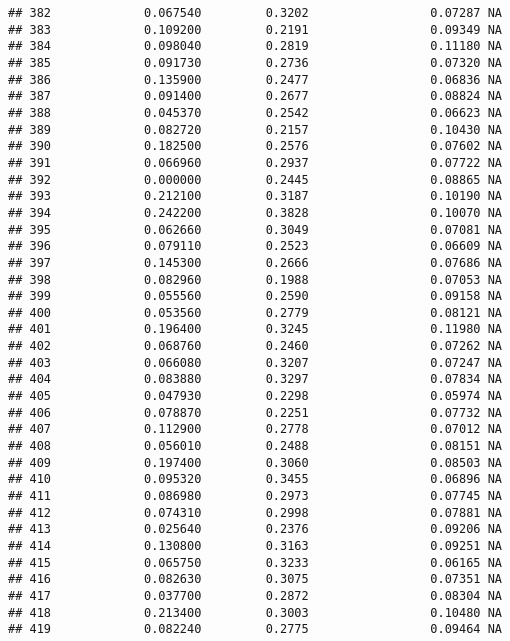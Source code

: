 \documentclass[
]{article}
\begin{document}
\begin{verbatim}
## 382             0.067540         0.3202                 0.07287 NA
## 383             0.109200         0.2191                 0.09349 NA
## 384             0.098040         0.2819                 0.11180 NA
## 385             0.091730         0.2736                 0.07320 NA
## 386             0.135900         0.2477                 0.06836 NA
## 387             0.091400         0.2677                 0.08824 NA
## 388             0.045370         0.2542                 0.06623 NA
## 389             0.082720         0.2157                 0.10430 NA
## 390             0.182500         0.2576                 0.07602 NA
## 391             0.066960         0.2937                 0.07722 NA
## 392             0.000000         0.2445                 0.08865 NA
## 393             0.212100         0.3187                 0.10190 NA
## 394             0.242200         0.3828                 0.10070 NA
## 395             0.062660         0.3049                 0.07081 NA
## 396             0.079110         0.2523                 0.06609 NA
## 397             0.145300         0.2666                 0.07686 NA
## 398             0.082960         0.1988                 0.07053 NA
## 399             0.055560         0.2590                 0.09158 NA
## 400             0.053560         0.2779                 0.08121 NA
## 401             0.196400         0.3245                 0.11980 NA
## 402             0.068760         0.2460                 0.07262 NA
## 403             0.066080         0.3207                 0.07247 NA
## 404             0.083880         0.3297                 0.07834 NA
## 405             0.047930         0.2298                 0.05974 NA
## 406             0.078870         0.2251                 0.07732 NA
## 407             0.112900         0.2778                 0.07012 NA
## 408             0.056010         0.2488                 0.08151 NA
## 409             0.197400         0.3060                 0.08503 NA
## 410             0.095320         0.3455                 0.06896 NA
## 411             0.086980         0.2973                 0.07745 NA
## 412             0.074310         0.2998                 0.07881 NA
## 413             0.025640         0.2376                 0.09206 NA
## 414             0.130800         0.3163                 0.09251 NA
## 415             0.065750         0.3233                 0.06165 NA
## 416             0.082630         0.3075                 0.07351 NA
## 417             0.037700         0.2872                 0.08304 NA
## 418             0.213400         0.3003                 0.10480 NA
## 419             0.082240         0.2775                 0.09464 NA

\end{verbatim}
\end{document}

